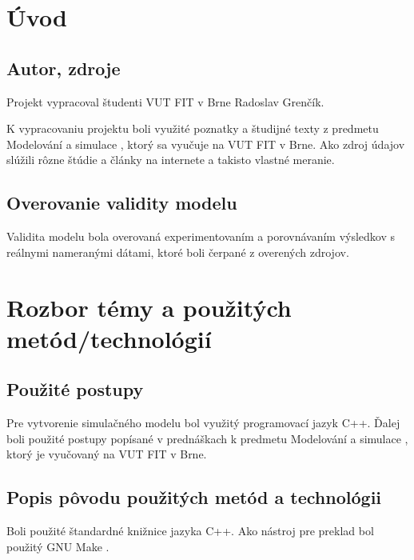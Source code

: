 \documentclass[a4paper, 11pt]{article}
\begin{document}
\section{Úvod}



\subsection{Autor, zdroje}

Projekt vypracoval študenti VUT FIT v Brne Radoslav Grenčík.

K vypracovaniu projektu boli využité poznatky a študijné texty z predmetu
Modelování a simulace \cite{IMS_slides}, ktorý sa vyučuje na VUT FIT v Brne. Ako zdroj údajov
slúžili rôzne štúdie a články na internete a takisto vlastné meranie.

\subsection{Overovanie validity modelu}

Validita modelu bola overovaná experimentovaním a porovnávaním výsledkov s
reálnymi nameranými dátami, ktoré boli čerpané z overených zdrojov.

\pagebreak
\section{Rozbor témy a použitých metód/technológií}



\subsection{Použité postupy}

Pre vytvorenie simulačného modelu bol využitý programovací jazyk C++. Ďalej boli použité postupy popísané v prednáškach k predmetu Modelování a simulace \cite{IMS_slides}, ktorý je vyučovaný na VUT FIT v Brne.

\subsection{Popis pôvodu použitých metód a technológii}

Boli použité štandardné knižnice jazyka C++. Ako nástroj pre preklad bol použitý GNU Make \cite{make}.
\end{document}
